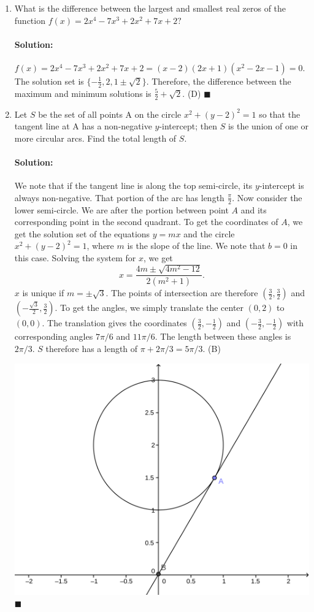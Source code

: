 \documentclass{article}
\newenvironment{solution}{\paragraph{Solution:}}{\hfill$\blacksquare$}
\begin{document}
\begin{enumerate}
	\item What is the difference between the largest and smallest real zeros of the function $f(x)=2x^4-7x^3 + 2x^2 + 7x + 2?$
	
	\begin{solution}
		$f(x)=2x^4-7x^3 + 2x^2 + 7x + 2=(x-2)(2x+1)(x^2-2x-1)=0$.
		The solution set is $\{-\frac{1}{2}, 2, 1\pm \sqrt{2} \}$. Therefore, the difference between the maximum and minimum solutions is $\frac{5}{2}+\sqrt{2}$. (D)
	\end{solution}

	\item Let $S$ be the set of all points A on the circle $x^2 + (y -2)^2 = 1$ so that the tangent line at
	A has a non-negative $y$-intercept; then $S$ is the union of one or more circular arcs. Find
	the total length of $S$.
	
	\begin{solution}
		We note that if the tangent line is along the top semi-circle, its $y$-intercept is always non-negative. That portion of the arc has length $\frac{\pi}{2}$. Now consider the lower semi-circle. We are after the portion between point $A$ and its corresponding point in the second quadrant. To get the coordinates of $A$, we get the solution set of the equations $y=mx$ and the circle  $x^2 + (y -2)^2 = 1$, where $m$ is the slope of the line. We note that $b=0$ in this case. Solving the system for $x$, we get
		\begin{equation}
			x = \frac{4m\pm \sqrt{4m^2-12}}{2(m^2+1)}.
		\end{equation}
		$x$ is unique if $m=\pm\sqrt{3}$. The points of intersection are therefore $(\frac{3}{2}, \frac{3}{2})$ and $(-\frac{\sqrt{3}}{2}, \frac{3}{2})$. To get the angles, we simply translate the center $(0,2)$ to $(0,0)$. The translation gives the coordinates $(\frac{3}{2}, -\frac{1}{2})$ and $(-\frac{3}{2}, -\frac{1}{2})$ with corresponding angles $7\pi/6$ and $11\pi/6$. The length between these angles is $2\pi/3$. $S$ therefore has a length of $\pi + 2\pi/3=5\pi/3$. (B)
		
		
		\includegraphics[width=0.7\linewidth]{part2_3}
	\end{solution}


\end{enumerate}
\end{document}
